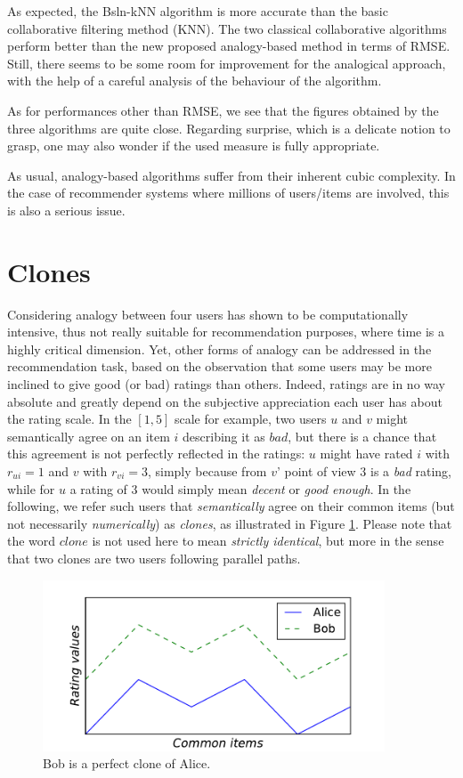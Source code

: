 As expected, the Bsln-kNN algorithm is more accurate than the basic
collaborative filtering method (KNN). The two classical collaborative
algorithms perform better than the new proposed analogy-based method in terms
of RMSE. Still, there seems to be some room for improvement for the analogical
approach, with the help of a careful analysis of the behaviour of the
algorithm.

As for performances other than RMSE, we see that the figures obtained by the
three algorithms are quite close. Regarding surprise, which is a delicate
notion to grasp, one may also wonder if the used measure is fully appropriate.

As usual, analogy-based algorithms suffer from their inherent cubic complexity.
In the case of recommender systems where millions of users/items are involved,
this is also a serious issue.

\section{Clones}

Considering analogy between four users has shown to be computationally
intensive, thus not really suitable for recommendation purposes, where time is
a highly critical dimension. Yet, other forms of analogy can be addressed in
the recommendation task, based on the observation that some users may be more
inclined to give good (or bad) ratings than others. Indeed, ratings are in no
way absolute and greatly depend on the subjective appreciation each user has
about the rating scale. In the $[1, 5]$ scale for example, two users $u$ and
$v$ might semantically agree on an item $i$ describing it as $bad$, but there
is a chance that this agreement is not perfectly reflected in the ratings: $u$
might have rated $i$ with $r_{ui} = 1$ and $v$ with $r_{vi} = 3$, simply
because from $v$' point of view $3$ is a \textit{bad} rating, while for $u$ a
rating of $3$ would simply mean \textit{decent} or \textit{good enough}.  In
the following, we refer such users that \textit{semantically} agree on their
common items (but not necessarily \textit{numerically}) as \textit{clones}, as
illustrated in Figure \ref{FIG:alice_and_bob_clones}. Please note that the word
$clone$ is not used here to mean \textit{strictly identical}, but more in the
sense that two clones are two users following parallel paths.

\begin{figure}[!h]
\centering
\includegraphics[width=4in]{figures/clones.pdf}
\caption{Bob is a perfect clone of Alice.}
\label{FIG:alice_and_bob_clones}
\end{figure}

